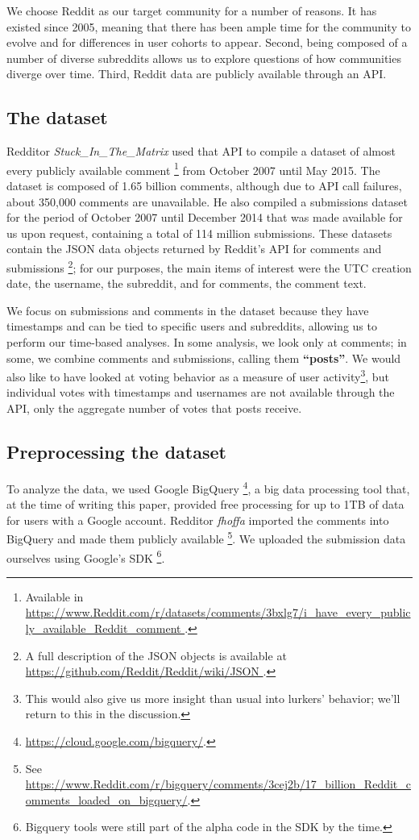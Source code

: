 We choose Reddit as our target community for a number of reasons.  It has existed since 2005, meaning that there has been ample time for the community to evolve and for differences in user cohorts to appear.  Second, being composed of a number of diverse subreddits allows us to explore questions of how communities diverge over time.  Third, Reddit data are publicly available through an API.

\subsection{The dataset}

Redditor \textit{Stuck\_In\_The\_Matrix} used that API to compile a dataset of almost every publicly available comment \footnote{Available in \url{https://www.Reddit.com/r/datasets/comments/3bxlg7/i_have_every_publicly_available_Reddit_comment }.} from October 2007 until May 2015.  The dataset is composed of 1.65 billion comments, although due to API call failures, about 350,000 comments are unavailable.  He also compiled a submissions dataset for the period of October 2007 until December 2014 that was made available for us upon request, containing a total of 114 million submissions.  These datasets contain the JSON data objects returned by Reddit's API for comments and submissions \footnote{A full description of the JSON objects is available at \url{https://github.com/Reddit/Reddit/wiki/JSON }.}; for our purposes, the main items of interest were the UTC creation date, the username, the subreddit, and for comments, the comment text.

We focus on submissions and comments in the dataset because they have timestamps and can be tied to specific users and subreddits, allowing us to perform our time-based analyses.   In some analysis, we look only at comments; in some, we combine comments and submissions, calling them \textbf{``posts''}.  We would also like to have looked at voting behavior as a measure of user activity\footnote{This would also give us more insight than usual into lurkers' behavior; we'll return to this in the discussion.}, but individual votes with timestamps and usernames are not available through the API, only the aggregate number of votes that posts receive.

\subsection{Preprocessing the dataset}

To analyze the data, we used Google BigQuery \footnote{\url{https://cloud.google.com/bigquery/}.}, a big data processing tool that, at the time of writing this paper, provided free processing for up to 1TB of data for users with a Google account.  Redditor \textit{fhoffa} imported the comments into BigQuery and made them publicly available \footnote{See \url{https://www.Reddit.com/r/bigquery/comments/3cej2b/17_billion_Reddit_comments_loaded_on_bigquery/}.}.  We uploaded the submission data ourselves using Google's SDK \footnote{Bigquery tools were still part of the alpha code in the SDK by the time.}.


